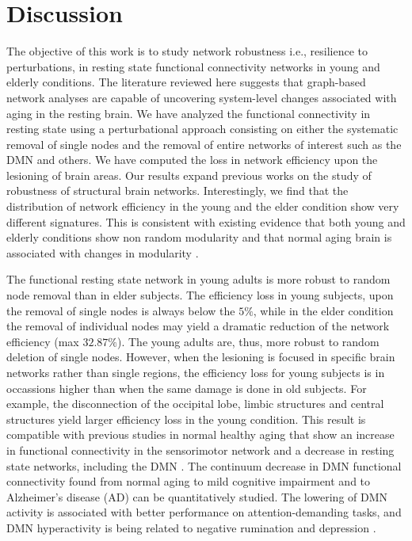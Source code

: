 \documentclass[12pt,a4paper]{article}
\begin{document}
\section{Discussion}
\label{discussion}

The objective of this work is to study network robustness i.e., resilience to
perturbations, in resting state functional connectivity networks in young and elderly conditions.
The literature reviewed here suggests that graph-based network
analyses are capable of uncovering system-level changes associated with
aging in the resting brain. 
We have analyzed the functional connectivity in resting state using a perturbational approach consisting on either the systematic removal of single nodes and the removal of entire networks of interest such as the DMN and others. We have computed the loss in network efficiency upon the lesioning of brain areas.
Our results expand previous works on the study of robustness of
structural brain networks. %
Interestingly, we find that the distribution of network efficiency in the young and the elder condition show very different signatures. This is consistent with existing evidence \cite{meunier_age-related_2009} that both young and elderly conditions show non random modularity and that normal aging brain is associated with changes in modularity \cite{song_age-related_2014}.

The functional resting state network in young adults is more robust to random node removal than in elder subjects. The efficiency loss in young subjects, upon the removal of single nodes is always below the $5\%$, while in the elder condition the removal of individual nodes may yield a dramatic reduction of the network efficiency (max $32.87\%$).
The young adults are, thus, more robust to random deletion of single nodes. However, when the lesioning is focused in specific brain networks rather than single regions, the efficiency loss for young subjects is in occassions higher than when the same damage is done in old subjects. For example, the disconnection of the occipital lobe, limbic structures and central structures yield larger efficiency loss in the young condition. This result is compatible with previous studies in normal healthy aging that show an increase in functional connectivity in the sensorimotor network and a decrease in resting state networks, including the DMN \cite{song_age-related_2014}.
The continuum decrease in DMN functional connectivity found from normal aging to mild cognitive impairment and to Alzheimer's disease (AD) can be quantitatively studied. The lowering of DMN activity is associated with better performance on attention-demanding tasks, and DMN hyperactivity is being related to negative rumination and depression \cite{whitfield-gabrieli_default_2012}.    
\end{document}
